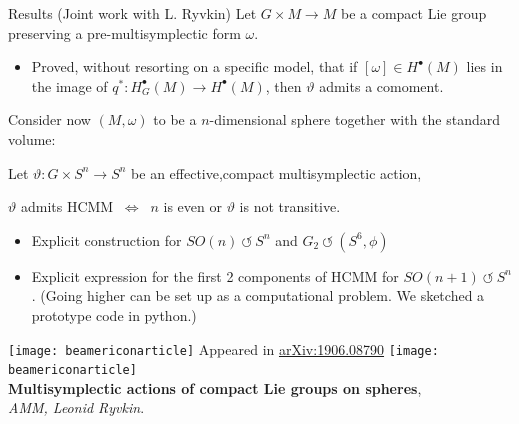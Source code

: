 \documentclass[handout,10pt]{beamer}
\begin{document}
\begin{frame}[fragile]{Results (Joint work with L. Ryvkin)}
	Let $G\times M\to M$ be a compact Lie group preserving a pre-multisymplectic form $\omega$.
	\begin{itemize}
		\item Proved, without resorting on a specific model, that if $[\omega]\in H^\bullet(M)$ lies in the image of $q^*:H^\bullet_G(M)\to H^\bullet(M)$, then $\vartheta$ admits a comoment.
	\end{itemize}
	\pause
	\vspace{1em}
	Consider now $(M,\omega)$ to be a $n$-dimensional sphere together with the standard volume:
			\begin{claimblock}
				Let $\vartheta:G\times S^n \to S^n$ be an effective,compact multisymplectic action,
				\begin{center}
					$\vartheta$ admits HCMM $~\Leftrightarrow~$ $n$ is even or $\vartheta$ is not transitive.
				\end{center}
			\end{claimblock}
	\begin{itemize}
		\item 	Explicit construction for 
	$SO(n)~\circlearrowleft~S^{n}$ and
	$G_2~\circlearrowleft~(S^6,\phi)$
		\item  Explicit expression for the first 2 components of HCMM for 
			$SO(n+1)~\circlearrowleft~S^{n}$.
		 (Going higher can be set up as a computational problem. We sketched a prototype code in python.)
		 	\end{itemize}

	\pause
	\begin{center}
		\texttt{[image: beamericonarticle]} Appeared in \href{a}{arXiv:1906.08790} \texttt{[image: beamericonarticle]} \\ 
				\textbf{Multisymplectic actions of compact Lie groups on spheres},\\
				\emph{AMM, Leonid Ryvkin}. 			
	\end{center}	

\end{frame}
\end{document}
